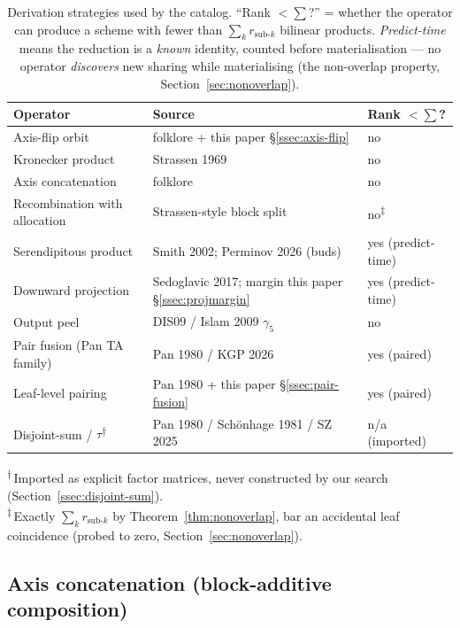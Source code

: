 \begin{table}[h]
\centering
\caption{Derivation strategies used by the catalog. ``Rank \(<\!\sum\)?'' = whether the
operator can produce a scheme with fewer than \(\sum_k r_{\text{sub-}k}\) bilinear products.
\emph{Predict-time} means the reduction is a \emph{known} identity, counted before
materialisation --- no operator \emph{discovers} new sharing while materialising (the
non-overlap property, Section~\ref{sec:nonoverlap}).}
\label{tab:strategies}
\begin{tabular}{lll}
\toprule
Operator & Source & Rank \(<\!\sum\)? \\
\midrule
Axis-flip orbit & folklore + this paper \S\ref{ssec:axis-flip} & no \\
Kronecker product & Strassen 1969 & no \\
Axis concatenation & folklore & no \\
Recombination with allocation & Strassen-style block split & no\textsuperscript{$\ddagger$} \\
Serendipitous product & Smith 2002; Perminov 2026 (buds) & yes (predict-time) \\
Downward projection & Sedoglavic 2017; margin this paper \S\ref{ssec:projmargin} & yes (predict-time) \\
Output peel & DIS09 / Islam 2009 \(\gamma_5\) & no \\
Pair fusion (Pan TA family) & Pan 1980 / KGP 2026 & yes (paired) \\
Leaf-level pairing & Pan 1980 + this paper \S\ref{ssec:pair-fusion} & yes (paired) \\
Disjoint-sum / $\tau$\textsuperscript{$\dagger$} & Pan 1980 / Sch\"onhage 1981 / SZ 2025 & n/a (imported) \\
\bottomrule
\end{tabular}

\smallskip
\noindent\textsuperscript{$\dagger$}\,Imported as explicit factor matrices, never constructed by our search (Section~\ref{ssec:disjoint-sum}).\\
\noindent\textsuperscript{$\ddagger$}\,Exactly \(\sum_k r_{\text{sub-}k}\) by Theorem~\ref{thm:nonoverlap}, bar an accidental leaf coincidence (probed to zero, Section~\ref{sec:nonoverlap}).
\end{table}

\subsection{Axis concatenation (block-additive composition)}
\label{ssec:concat}

